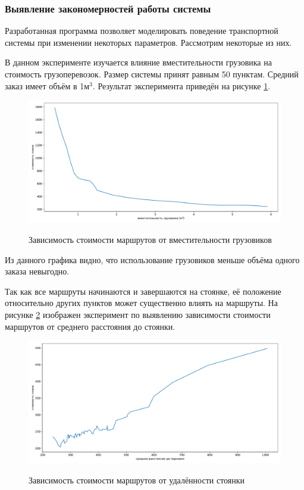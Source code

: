 \subsubsection{Выявление закономерностей работы системы}
Разработанная программа позволяет моделировать поведение транспортной системы при изменении некоторых параметров. Рассмотрим некоторые из них.

В данном эксперименте изучается влияние вместительности грузовика на стоимость грузоперевозок. Размер системы принят равным 50 пунктам. Средний заказ имеет объём в 1м$^3$. Результат эксперимента приведён на рисунке \ref{exp:truck_vol}.

\begin{figure}[h!]
	\begin{center}
		{\includegraphics[scale=0.5, angle=0, page=1]{research/truck_vol.pdf}}
		\caption{Зависимость стоимости маршрутов от вместительности грузовиков}
		\label{exp:truck_vol}
	\end{center}
\end{figure}

Из данного графика видно, что использование грузовиков меньше объёма одного заказа невыгодно. 

\pagebreak
Так как все маршруты начинаются и завершаются на стоянке, её положение относительно других пунктов может существенно влиять на маршруты. На рисунке \ref{exp:parking_dist} изображен эксперимент по выявлению зависимости стоимости маршрутов от среднего расстояния до стоянки. 

\begin{figure}[h!]
	\begin{center}
		{\includegraphics[scale=0.5, angle=0, page=1]{research/parking_dist.pdf}}
		\caption{Зависимость стоимости маршрутов от удалённости стоянки}
		\label{exp:parking_dist}
	\end{center}
\end{figure}


